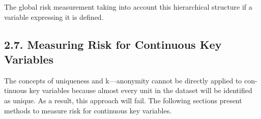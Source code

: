 \documentclass[]{article}
\begin{document}
The global risk measurement taking into account this hierarchical structure if a
variable expressing it is defined.
%
%
%
%

\subsection*{2.7. Measuring Risk for Continuous Key Variables}
The concepts of uniqueness and k—anonymity cannot be directly applied to con-
tinuous key variables because almost every unit in the dataset will be identiﬁed as
unique. As a result, this approach will fail. The following sections present methods
to measure risk for continuous key variables.
\end{document}
